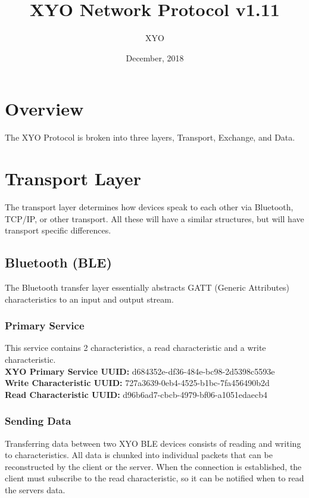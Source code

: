 \documentclass[11pt]{article}
\author{XYO}
\title{XYO Network Protocol v1.11}
\date{December, 2018}
\begin{document}
\maketitle


\section{Overview}
The XYO Protocol is broken into three layers, Transport, Exchange, and Data.

\section{Transport Layer}
The transport layer determines how devices speak to each other via Bluetooth, TCP/IP,
or other transport. All these will have a similar structures, but will have transport
specific differences.

\subsection{Bluetooth (BLE)}
The Bluetooth transfer layer essentially abstracts GATT (Generic Attributes) characteristics to an input and output stream.

\subsubsection{Primary Service}
This service contains 2 characteristics, a read characteristic and a write characteristic. \\

\noindent
\textbf{XYO Primary Service UUID:} d684352e-df36-484e-bc98-2d5398c5593e \\
\textbf{Write Characteristic UUID:} 727a3639-0eb4-4525-b1bc-7fa456490b2d \\
\textbf{Read Characteristic UUID:} d96b6ad7-cbcb-4979-bf06-a1051edaecb4 \\

\subsubsection{Sending Data}
Transferring data between two XYO BLE devices consists of reading and writing to characteristics. All data is chunked into individual packets that can be reconstructed by the client or the server. When the connection is established, the client must subscribe to the read characteristic, so it can be notified when to read the servers data.
\end{document}
